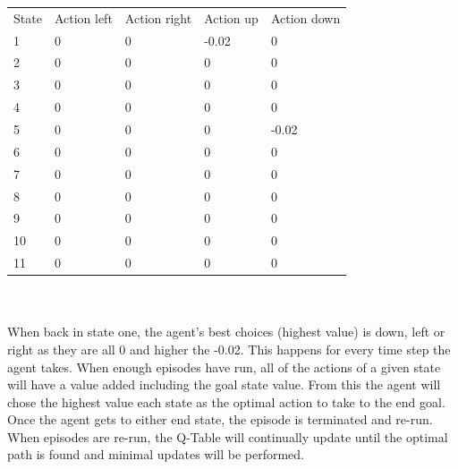 \begin{tabular}{lllll}
State & Action left & Action right & Action up & Action down \\
1     & 0           & 0            & -0.02     & 0           \\
2     & 0           & 0            & 0         & 0           \\
3     & 0           & 0            & 0         & 0           \\
4     & 0           & 0            & 0         & 0           \\
5     & 0           & 0            & 0         & -0.02       \\
6     & 0           & 0            & 0         & 0           \\
7     & 0           & 0            & 0         & 0           \\
8     & 0           & 0            & 0         & 0           \\
9     & 0           & 0            & 0         & 0           \\
10    & 0           & 0            & 0         & 0           \\
11    & 0           & 0            & 0         & 0     
\end{tabular}
\\
\\
When back in state one, the agent’s best choices (highest value) is down, left or right as they are all 0 and higher the -0.02. This happens for every time step the agent takes. When enough episodes have run, all of the actions of a given state will have a value added including the goal state value. From this the agent will chose the highest value each state as the optimal action to take to the end goal. 
Once the agent gets to either end state, the episode is terminated and re-run. When episodes are re-run, the Q-Table will continually update until the optimal path is found and minimal updates will be performed.\\

